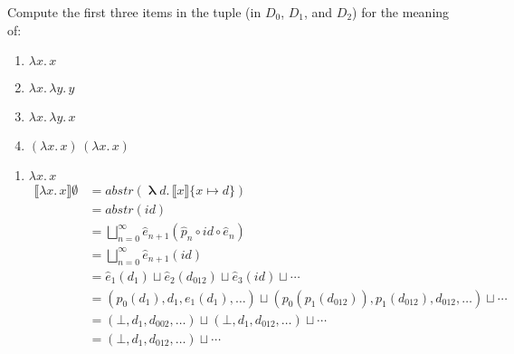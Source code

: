 \documentclass{tufte-handout}
\newcommand{\SEM}[1]{\llbracket #1 \rrbracket}
\newcommand{\LAM}[1]{\lambda #1.\,}
\newcommand{\MLAM}[1]{\boldsymbol\uplambda #1.\,}
\newcommand{\APP}[0]{\,}
\begin{document}
\begin{Exercise}
  Compute the first three items in the tuple (in $D_0$, $D_1$, and
  $D_2$) for the meaning of:
  \begin{enumerate}
  \item $\LAM{x}x$
  \item $\LAM{x}\LAM{y}y$
  \item $\LAM{x}\LAM{y}x$
  \item $(\LAM{x}x) \APP (\LAM{x}x)$
  \end{enumerate}
\end{Exercise}
\begin{Answer}
  \begin{enumerate}
  \item $\LAM{x}x$ 
    \begin{align*}
      \SEM{\LAM{x} x}\emptyset &= \mathit{abstr}(\MLAM{d} \SEM{x}\{x\mapsto d\}) \\
      &= \mathit{abstr}(\mathit{id}) \\
      &= \bigsqcup_{n=0}^{\infty} \hat{e}_{n+1}(\hat{p}_n\circ \mathit{id} \circ \hat{e}_n) \\
      &= \bigsqcup_{n=0}^{\infty} \hat{e}_{n+1}(\mathit{id}) \\
      &= \hat{e}_1(d_1) \sqcup \hat{e}_2 (d_{012}) 
      \sqcup \hat{e}_3 (\mathit{id}) 
      \sqcup \cdots \\
      &= (p_0(d_1), d_1, e_1(d_1), \ldots) \sqcup 
         (p_0(p_1(d_{012})), p_1(d_{012}), d_{012}, \ldots) \sqcup \cdots\\
      &= (\bot, d_1, d_{002}, \ldots) \sqcup 
         (\bot, d_1, d_{012}, \ldots) \sqcup \cdots\\
      &= (\bot, d_1, d_{012}, \ldots) \sqcup \cdots
    \end{align*}


\end{enumerate}
\end{Answer}
\end{document}
